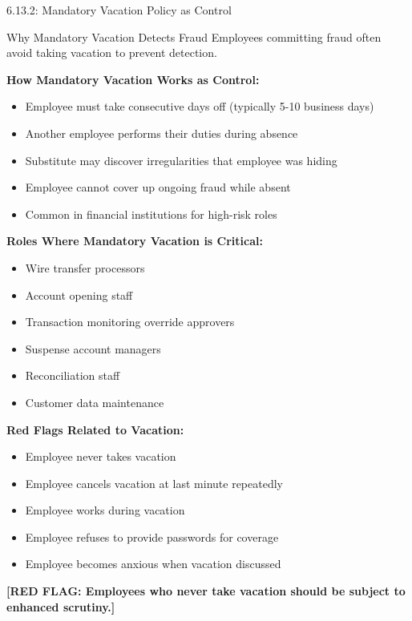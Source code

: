 \documentclass[11pt,a4paper]{beamer}
\newcommand{\redflag}[1]{\textcolor{red!80!black}{\textbf{[RED FLAG: #1]}}}
\begin{document}
\begin{frame}{6.13.2: Mandatory Vacation Policy as Control}
	\begin{block}{Why Mandatory Vacation Detects Fraud}
		Employees committing fraud often avoid taking vacation to prevent detection.
	\end{block}
	\textbf{How Mandatory Vacation Works as Control:}
	\begin{itemize}
		\item Employee must take consecutive days off (typically 5-10 business days)
		\item Another employee performs their duties during absence
		\item Substitute may discover irregularities that employee was hiding
		\item Employee cannot cover up ongoing fraud while absent
		\item Common in financial institutions for high-risk roles
	\end{itemize}
	\textbf{Roles Where Mandatory Vacation is Critical:}
	\begin{itemize}
		\item Wire transfer processors
		\item Account opening staff
		\item Transaction monitoring override approvers
		\item Suspense account managers
		\item Reconciliation staff
		\item Customer data maintenance
	\end{itemize}
	\textbf{Red Flags Related to Vacation:}
	\begin{itemize}
		\item Employee never takes vacation
		\item Employee cancels vacation at last minute repeatedly
		\item Employee works during vacation
		\item Employee refuses to provide passwords for coverage
		\item Employee becomes anxious when vacation discussed
	\end{itemize}
	\redflag{Employees who never take vacation should be subject to enhanced scrutiny.}
\end{frame}

\end{document}
